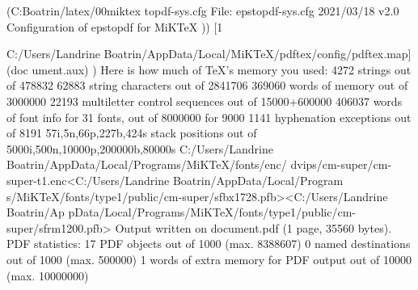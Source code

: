 (C:\Users\Landrine Boatrin\AppData\Local\Programs\MiKTeX\tex/latex/00miktex\eps
topdf-sys.cfg
File: epstopdf-sys.cfg 2021/03/18 v2.0 Configuration of epstopdf for MiKTeX
)) [1

{C:/Users/Landrine Boatrin/AppData/Local/MiKTeX/pdftex/config/pdftex.map}] (doc
ument.aux) ) 
Here is how much of TeX's memory you used:
 4272 strings out of 478832
 62883 string characters out of 2841706
 369060 words of memory out of 3000000
 22193 multiletter control sequences out of 15000+600000
 406037 words of font info for 31 fonts, out of 8000000 for 9000
 1141 hyphenation exceptions out of 8191
 57i,5n,66p,227b,424s stack positions out of 5000i,500n,10000p,200000b,80000s
{C:/Users/Landrine Boatrin/AppData/Local/Programs/MiKTeX/fonts/enc/
dvips/cm-super/cm-super-t1.enc}<C:/Users/Landrine Boatrin/AppData/Local/Program
s/MiKTeX/fonts/type1/public/cm-super/sfbx1728.pfb><C:/Users/Landrine Boatrin/Ap
pData/Local/Programs/MiKTeX/fonts/type1/public/cm-super/sfrm1200.pfb>
Output written on document.pdf (1 page, 35560 bytes).
PDF statistics:
 17 PDF objects out of 1000 (max. 8388607)
 0 named destinations out of 1000 (max. 500000)
 1 words of extra memory for PDF output out of 10000 (max. 10000000)


